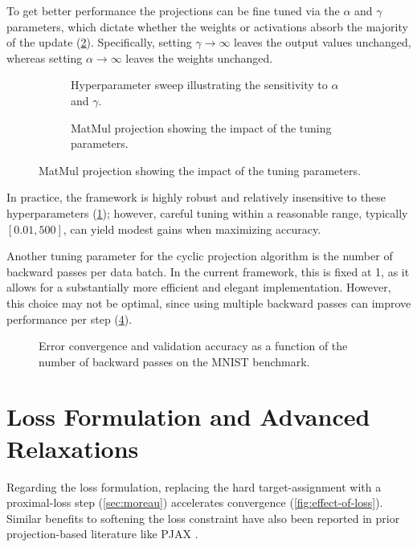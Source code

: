 To get better performance the projections can be fine tuned via the $\alpha$ and $\gamma$ parameters, which dictate whether the weights or activations absorb the majority of the update (\cref{fig:alpha-g-sweep}). Specifically, setting $\gamma \to \infty$ leaves the output values unchanged, whereas setting $\alpha \to  \infty$ leaves the weights unchanged. 
\begin{figure}[ht]
\centering
\begin{subfigure}[t]{0.46\textwidth}
\centering
{}
\caption{Hyperparameter sweep illustrating the sensitivity to $\alpha$ and $\gamma$.}
\label{fig:matmul-sweep}
\end{subfigure}
\hfill
\begin{subfigure}[t]{0.46\textwidth}
\centering
{}
\caption{MatMul projection showing the impact of the tuning parameters.}
\label{fig:alpha-g-sweep}
\end{subfigure}
\label{fig:projection-params}
\end{figure}
In practice, the framework is highly robust and relatively insensitive to these hyperparameters (\cref{fig:matmul-sweep}); however, careful tuning within a reasonable range, typically $[0.01, 500]$, can yield modest gains when maximizing accuracy.

Another tuning parameter for the cyclic projection algorithm is the number of backward passes per data batch. In the current framework, this is fixed at 1, as it allows for a substantially more efficient and elegant implementation. However, this choice may not be optimal, since using multiple backward passes can improve performance per step (\cref{fig:backward-passes}).
\begin{figure}[ht]
\centering
{}
\caption{Error convergence and validation accuracy as a function of the number of backward passes on the MNIST benchmark.}
\label{fig:backward-passes}
\end{figure}


\section{Loss Formulation and Advanced Relaxations}
\label{sec:exp-relaxation-location}
Regarding the loss formulation, replacing the hard target-assignment with a proximal-loss step (\cref{sec:moreau}) accelerates convergence (\cref{fig:effect-of-loss}). Similar benefits to softening the loss constraint have also been reported in prior projection-based literature like PJAX \cite{bergmeister2025projection}.


